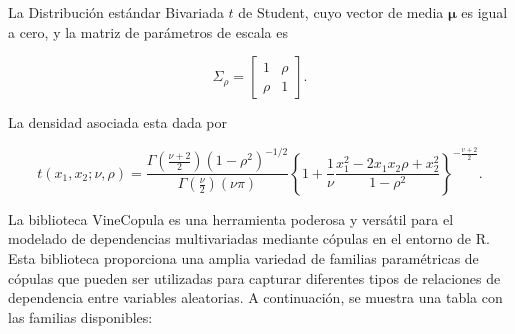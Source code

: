 \begin{ejemplo} La Distribución estándar Bivariada $t$ de Student, cuyo vector de media $\boldsymbol{\mu}$ es igual a cero, y la matriz de parámetros de escala es

\begin{equation}
    \Sigma_\rho=\left[\begin{array}{ll}
    1 & \rho \\
    \rho & 1
    \end{array}\right] .
\end{equation}

La densidad asociada esta dada por

\begin{equation}
    t\left(x_1, x_2 ; \nu, \rho\right)=\frac{\Gamma\left(\frac{\nu+2}{2}\right)\left(1-\rho^2\right)^{-1 / 2}}{\Gamma\left(\frac{\nu}{2}\right)(\nu \pi)}\left\{1+\frac{1}{\nu} \frac{x_1^2-2 x_1 x_2 \rho+x_2^2}{1-\rho^2}\right\}^{-\frac{v+2}{2}} .
\end{equation}
\end{ejemplo}

La biblioteca VineCopula es una herramienta poderosa y versátil para el modelado de dependencias multivariadas mediante cópulas en el entorno de R. Esta biblioteca proporciona una amplia variedad de familias paramétricas de cópulas que pueden ser utilizadas para capturar diferentes tipos de relaciones de dependencia entre variables aleatorias. A continuación, se muestra una tabla con las familias disponibles:

